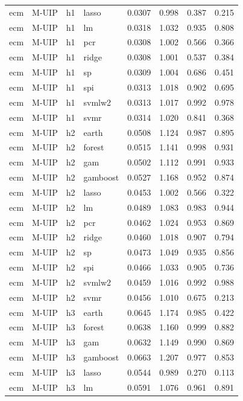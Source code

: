 \begin{ThreePartTable}
\begin{longtable}[t]{llclcccc}
ecm & M-UIP & h1 & lasso & 0.0307 & 0.998 & 0.387 & 0.215\\
ecm & M-UIP & h1 & lm & 0.0318 & 1.032 & 0.935 & 0.808\\
ecm & M-UIP & h1 & pcr & 0.0308 & 1.002 & 0.566 & 0.366\\
ecm & M-UIP & h1 & ridge & 0.0308 & 1.001 & 0.537 & 0.384\\
ecm & M-UIP & h1 & sp & 0.0309 & 1.004 & 0.686 & 0.451\\
ecm & M-UIP & h1 & spi & 0.0313 & 1.018 & 0.902 & 0.695\\
ecm & M-UIP & h1 & svmlw2 & 0.0313 & 1.017 & 0.992 & 0.978\\
ecm & M-UIP & h1 & svmr & 0.0314 & 1.020 & 0.841 & 0.368\\
\addlinespace
ecm & M-UIP & h2 & earth & 0.0508 & 1.124 & 0.987 & 0.895\\
ecm & M-UIP & h2 & forest & 0.0515 & 1.141 & 0.998 & 0.931\\
ecm & M-UIP & h2 & gam & 0.0502 & 1.112 & 0.991 & 0.933\\
ecm & M-UIP & h2 & gamboost & 0.0527 & 1.168 & 0.952 & 0.874\\
ecm & M-UIP & h2 & lasso & 0.0453 & 1.002 & 0.566 & 0.322\\
ecm & M-UIP & h2 & lm & 0.0489 & 1.083 & 0.983 & 0.944\\
ecm & M-UIP & h2 & pcr & 0.0462 & 1.024 & 0.953 & 0.869\\
ecm & M-UIP & h2 & ridge & 0.0460 & 1.018 & 0.907 & 0.794\\
ecm & M-UIP & h2 & sp & 0.0473 & 1.049 & 0.935 & 0.856\\
ecm & M-UIP & h2 & spi & 0.0466 & 1.033 & 0.905 & 0.736\\
ecm & M-UIP & h2 & svmlw2 & 0.0459 & 1.016 & 0.992 & 0.988\\
ecm & M-UIP & h2 & svmr & 0.0456 & 1.010 & 0.675 & 0.213\\
\addlinespace
ecm & M-UIP & h3 & earth & 0.0645 & 1.174 & 0.985 & 0.422\\
ecm & M-UIP & h3 & forest & 0.0638 & 1.160 & 0.999 & 0.882\\
ecm & M-UIP & h3 & gam & 0.0632 & 1.149 & 0.990 & 0.869\\
ecm & M-UIP & h3 & gamboost & 0.0663 & 1.207 & 0.977 & 0.853\\
ecm & M-UIP & h3 & lasso & 0.0544 & 0.989 & 0.270 & 0.113\\
ecm & M-UIP & h3 & lm & 0.0591 & 1.076 & 0.961 & 0.891\\

\end{longtable}
\end{ThreePartTable}
